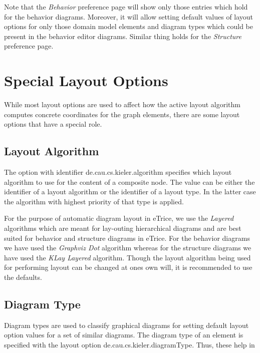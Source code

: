 Note that the \textit{Behavior} preference page will show only those entries which hold for the behavior diagrams. Moreover, it will allow setting default values of layout options for only those domain model elements and diagram types which could be present in the behavior editor diagrams. Similar thing holds for the \textit{Structure} preference page.

\section{\label{specialOptions}Special Layout Options}

While most layout options are used to affect how the active layout algorithm computes concrete coordinates for the graph elements, there are some layout options that have a special role.

\subsection{Layout Algorithm}

The option with identifier de.cau.cs.kieler.algorithm specifies which layout algorithm to use for the content of a composite node. The value can be either the identifier of a layout algorithm or the identifier of a layout type. In the latter case the algorithm with highest priority of that type is applied.

For the purpose of automatic diagram layout in eTrice, we use the \textit{Layered} algorithms which are meant for lay-outing hierarchical diagrams and are best suited for behavior and structure diagrams in eTrice. For the behavior diagrams we have used the \textit{Graphviz Dot} algorithm whereas for the structure diagrams we have used the \textit{KLay Layered} algorithm. Though the layout algorithm being used for performing layout can be changed at ones own will, it is recommended to use the defaults.  

\subsection{Diagram Type}

Diagram types are used to classify graphical diagrams for setting default layout option values for a set of similar diagrams. The diagram type of an element is specified with the layout option de.cau.cs.kieler.diagramType. Thus, these help in 


